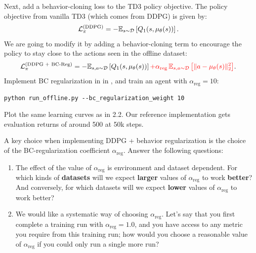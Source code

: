 \documentclass[11pt]{article}
\newcommand{\bcalpha}{10}
\begin{document}
Next, add a behavior-cloning loss to the TD3 policy objective. The policy objective from vanilla TD3 (which comes from DDPG) is given by:
\begin{equation}
  \mathcal{L}_\pi^{(\text{DDPG})} = -\mathbb{E}_{s\sim\mathcal{D}}\left[Q_1(s, \mu_\theta(s))\right].
\end{equation}
We are going to modify it by adding a behavior-cloning term to encourage the policy to stay close to the actions seen in the offline dataset:
\begin{equation}
  \mathcal{L}_\pi^{(\text{DDPG + BC-Reg})} = -\mathbb{E}_{s, a \sim \mathcal{D}}\left[Q_1(s, \mu_\theta(s))\right] \textcolor{red}{+ \alpha_\text{reg}\, \mathbb{E}_{s, a \sim \mathcal{D}}\left[\|a - \mu_\theta(s)\|_2^2\right]}.
\end{equation}
Implement BC regularization in  in , and train an agent with $\alpha_\text{reg} = \bcalpha$:
\begin{verbatim}
python run_offline.py --bc_regularization_weight 10
\end{verbatim}
Plot the same learning curves as in 2.2. Our reference implementation gets evaluation returns of around 500 at 50k steps.

A key choice when implementing DDPG + behavior regularization is the choice of the BC-regularization coefficient $\alpha_\text{reg}$. Answer the following questions:
\begin{enumerate}
  \item The effect of the value of $\alpha_\text{reg}$ is environment and dataset dependent. For which kinds of \textbf{datasets} will we expect \textbf{larger} values of $\alpha_\text{reg}$ to work \textbf{better}? And conversely, for which datasets will we expect \textbf{lower} values of $\alpha_\text{reg}$ to work better?
  \item We would like a systematic way of choosing $\alpha_\text{reg}$. Let's say that you first complete a training run with $\alpha_\text{reg} = 1.0$, and you have access to any metric you require from this training run; how would you choose a reasonable value of $\alpha_\text{reg}$ if you could only run a single more run?
\end{enumerate}
\end{document}
